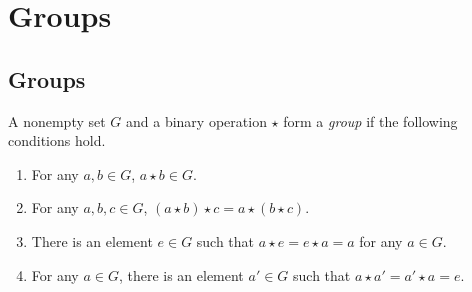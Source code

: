 \chapter{Groups}
\section{Groups}
\begin{definition}
  A nonempty set $G$ and a binary operation $\star$ form a \emph{group} if the
  following conditions hold.
  \begin{enumerate}[1.]
    \item For any $a, b \in G$, $a \star b \in G$.
    \item For any $a, b, c \in G$, $(a \star b) \star c = a \star (b \star c)$.
    \item There is an element $e \in G$ such that $a \star e = e \star a = a$
    for any $a \in G$.
    \item For any $a \in G$, there is an element $a' \in G$ such that
    $a \star a' = a' \star a = e$.
  \end{enumerate}
\end{definition}